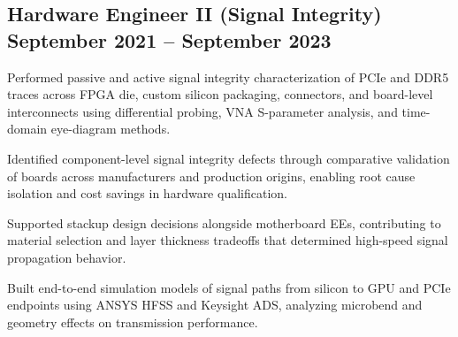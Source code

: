 \subsection{{Hardware Engineer II (Signal Integrity) \hfill September 2021 – September 2023}}
\begin{zitemize}
    \item Performed passive and active signal integrity characterization of PCIe and DDR5 traces across FPGA die, custom silicon packaging, connectors, and board-level interconnects using differential probing, VNA S-parameter analysis, and time-domain eye-diagram methods.
    \item Identified component-level signal integrity defects through comparative validation of boards across manufacturers and production origins, enabling root cause isolation and cost savings in hardware qualification.
    \item Supported stackup design decisions alongside motherboard EEs, contributing to material selection and layer thickness tradeoffs that determined high-speed signal propagation behavior.
    \item Built end-to-end simulation models of signal paths from silicon to GPU and PCIe endpoints using ANSYS HFSS and Keysight ADS, analyzing microbend and geometry effects on transmission performance.
\end{zitemize}
\vspace{6pt}
